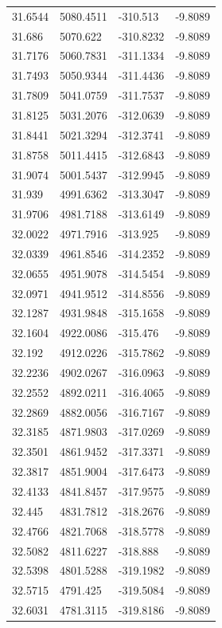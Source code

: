 \begin{table}[H]
\begin{tabular}{llll}
31.6544 & 5080.4511 & -310.513 & -9.8089 \\
31.686 & 5070.622 & -310.8232 & -9.8089 \\
31.7176 & 5060.7831 & -311.1334 & -9.8089 \\
31.7493 & 5050.9344 & -311.4436 & -9.8089 \\
31.7809 & 5041.0759 & -311.7537 & -9.8089 \\
31.8125 & 5031.2076 & -312.0639 & -9.8089 \\
31.8441 & 5021.3294 & -312.3741 & -9.8089 \\
31.8758 & 5011.4415 & -312.6843 & -9.8089 \\
31.9074 & 5001.5437 & -312.9945 & -9.8089 \\
31.939 & 4991.6362 & -313.3047 & -9.8089 \\
31.9706 & 4981.7188 & -313.6149 & -9.8089 \\
32.0022 & 4971.7916 & -313.925 & -9.8089 \\
32.0339 & 4961.8546 & -314.2352 & -9.8089 \\
32.0655 & 4951.9078 & -314.5454 & -9.8089 \\
32.0971 & 4941.9512 & -314.8556 & -9.8089 \\
32.1287 & 4931.9848 & -315.1658 & -9.8089 \\
32.1604 & 4922.0086 & -315.476 & -9.8089 \\
32.192 & 4912.0226 & -315.7862 & -9.8089 \\
32.2236 & 4902.0267 & -316.0963 & -9.8089 \\
32.2552 & 4892.0211 & -316.4065 & -9.8089 \\
32.2869 & 4882.0056 & -316.7167 & -9.8089 \\
32.3185 & 4871.9803 & -317.0269 & -9.8089 \\
32.3501 & 4861.9452 & -317.3371 & -9.8089 \\
32.3817 & 4851.9004 & -317.6473 & -9.8089 \\
32.4133 & 4841.8457 & -317.9575 & -9.8089 \\
32.445 & 4831.7812 & -318.2676 & -9.8089 \\
32.4766 & 4821.7068 & -318.5778 & -9.8089 \\
32.5082 & 4811.6227 & -318.888 & -9.8089 \\
32.5398 & 4801.5288 & -319.1982 & -9.8089 \\
32.5715 & 4791.425 & -319.5084 & -9.8089 \\
32.6031 & 4781.3115 & -319.8186 & -9.8089 \\

\end{tabular}
\end{table}
